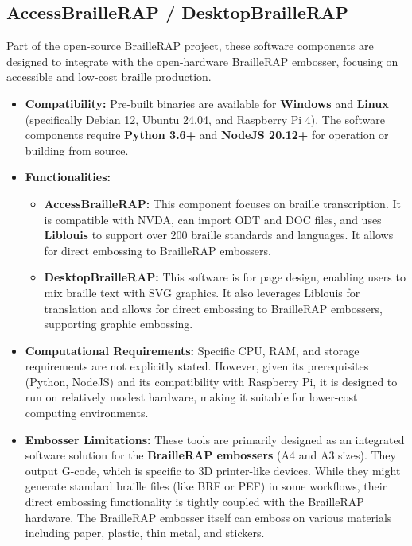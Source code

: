 \subsection{AccessBrailleRAP / DesktopBrailleRAP}
Part of the open-source BrailleRAP project, these software components are designed to integrate with the open-hardware BrailleRAP embosser, focusing on accessible and low-cost braille production.

\vspace{1em}
\begin{itemize}
\item \textbf{Compatibility:} Pre-built binaries are available for \textbf{Windows} and \textbf{Linux} (specifically Debian 12, Ubuntu 24.04, and Raspberry Pi 4). The software components require \textbf{Python 3.6+} and \textbf{NodeJS 20.12+} for operation or building from source\footnotemark[10].
\item \textbf{Functionalities:}
\vspace{0.5em}
\begin{itemize}
\item \textbf{AccessBrailleRAP:} This component focuses on braille transcription. It is compatible with NVDA, can import ODT and DOC files, and uses \textbf{Liblouis} to support over 200 braille standards and languages. It allows for direct embossing to BrailleRAP embossers\footnotemark[11].
\item \textbf{DesktopBrailleRAP:} This software is for page design, enabling users to mix braille text with SVG graphics. It also leverages Liblouis for translation and allows for direct embossing to BrailleRAP embossers, supporting graphic embossing\footnotemark[11].
\end{itemize}
\vspace{0.5em}
\item \textbf{Computational Requirements:} Specific CPU, RAM, and storage requirements are not explicitly stated. However, given its prerequisites (Python, NodeJS) and its compatibility with Raspberry Pi, it is designed to run on relatively modest hardware, making it suitable for lower-cost computing environments.
\item \textbf{Embosser Limitations:} These tools are primarily designed as an integrated software solution for the \textbf{BrailleRAP embossers} (A4 and A3 sizes)\footnotemark[11]. They output G-code, which is specific to 3D printer-like devices. While they might generate standard braille files (like BRF or PEF) in some workflows, their direct embossing functionality is tightly coupled with the BrailleRAP hardware. The BrailleRAP embosser itself can emboss on various materials including paper, plastic, thin metal, and stickers\footnotemark[11].

\end{itemize}
